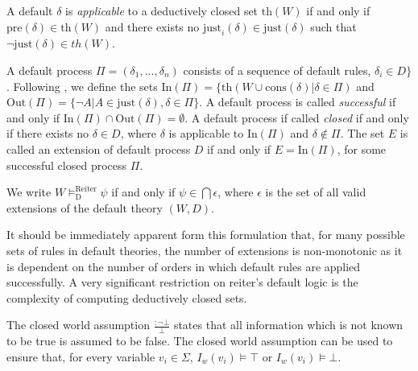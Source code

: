 A default $\delta$ is \textit{applicable} to a deductively closed set $\text{th}(W)$ if and only if $\text{pre}(\delta) \in \text{th}(W)$ and there exists no $\text{just}_i(\delta) \in \text{just}(\delta)$ such that $\lnot \text{just}(\delta) \in th(W)$.

A default process $\Pi=(\delta_1,...,\delta_n)$ consists of a sequence of default rules, $\delta_i\in D\}$. Following \cite{ragni2017formal}, we define the sets $\text{In}(\Pi)=\{\text{th}(W \cup \text{cons}(\delta)|\delta \in \Pi)$ and $\text{Out}(\Pi)=\{\lnot A|A \in \text{just}(\delta), \delta \in \Pi\}$. A default process is called \textit{successful} if and only if $\text{In}(\Pi)\cap \text{Out}(\Pi)=\emptyset$. A default process if called \textit{closed} if and only if there exists no $\delta \in D$, where $\delta$ is applicable to $\text{In}(\Pi)$ and $\delta \not\in \Pi$. The set $E$ is called an extension of default process $D$ if and only if $E=\text{In}(\Pi)$, for some successful closed process $\Pi$. 

We write $W\models_\text{D}^\text{Reiter} \psi$ if and only if $\psi \in \bigcap \epsilon$, where $\epsilon$ is the set of all valid extensions of the default theory $(W,D)$.


It should be immediately apparent form this formulation that, for many possible sets of rules in default theories, the number of extensions is non-monotonic as it is dependent on the number of orders in which default rules are applied successfully. A very significant restriction on reiter's default logic is the complexity of computing deductively closed sets.

The closed world assumption $\frac{: \lnot \bot}{\bot}$ states that all information which is not known to be true is assumed to be false. The closed world assumption can be used to ensure that, for every variable $v_i \in \Sigma$, $I_w(v_i) \models \top$ or $I_w(v_i) \models \bot$.



